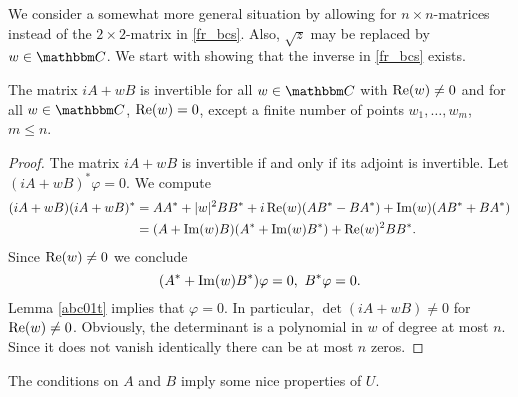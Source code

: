 We consider a somewhat more general situation by allowing for $n\times n$-matrices
instead of the $2\times 2$-matrix in \eqref{fr_bcs}. Also, $\sqrt{z}$ may be replaced by
$w\in\C$. We start with showing that the inverse in \eqref{fr_bcs} exists.

\begin{lemma}\label{bcs_general01t}
The matrix $iA+w B$ is invertible for all $w\in\C$ with $\operatorname{Re}(w)\neq 0$ and for all $w\in\C$, $\operatorname{Re}(w)=0$,
except a finite number of points $w_1,\ldots,w_m$, $m\leq n$.
\end{lemma}
\begin{proof}
The matrix $iA+w B$ is invertible if and only if its adjoint is invertible.
Let $(iA+wB)^*\varphi=0$. We compute
\begin{equation*}
\begin{split}
  (iA+w B)(iA+w B)^*
    & = AA^* + |w|^2BB^* +i\operatorname{Re}(w)(AB^* - BA^*) + \operatorname{Im}(w) (AB^*+BA^*) \\
    & = (A+\operatorname{Im}(w)B)(A^*+\operatorname{Im}(w)B^*) + \operatorname{Re}(w)^2 BB^* .
\end{split}
\end{equation*}
Since $\operatorname{Re}(w)\neq 0$ we conclude
\begin{equation*}
  (A^* + \operatorname{Im}(w) B^*)\varphi = 0,\ B^*\varphi = 0 .
\end{equation*}
Lemma \ref{abc01t} implies that $\varphi=0$. In particular, $\det(iA+wB)\neq 0$ for $\operatorname{Re}(w)\neq 0$.
Obviously, the determinant is a polynomial in $w$ of degree at most $n$. Since it does not vanish identically 
there can be at most $n$ zeros.
\end{proof}

The conditions on $A$ and $B$ imply some nice properties of $U$.

